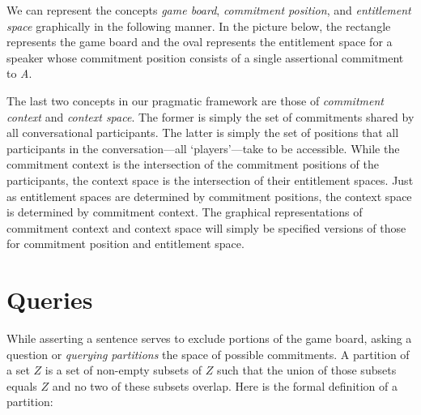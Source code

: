 \documentclass{article}                     %
\makeatletter
\theoremstyle{definition}
\newcommand{\raisemath}[1]{\mathpalette{\raisem@th{#1}}}
\newcommand{\raisem@th}[3]{\raisebox{#1}{$#2#3$}}
\newcommand{\nmc}{%
	\mathbin{\mathpalette\nm@\expandafter}
}
\newcommand{\nm@}{\mid\joinrel\mkern-.5mu\sim\mkern-3mu}
\newcommand{\nnmc}{\not\nmc}
\newcommand{\bigperpp}{%
	\mathop{\mathpalette\bigp@rpp\relax}%
	\displaylimits
}
\newcommand{\bigp@rpp}[2]{%
	\vcenter{
		\m@th\hbox{\scalebox{\ifx#1\displaystyle1.15\else1.15\fi}{$#1\perp$}}
	}%
}
\newcommand{\bigperp}{\raisemath{.5pt}{\bigperpp}}
\makeatother
\begin{document}
We can represent the concepts \textit{game board}, \textit{commitment position}, and \textit{entitlement space} graphically in the following manner.  In the picture below, the rectangle represents the game board and the oval represents the entitlement space for a speaker whose commitment position consists of a single assertional commitment to \textit{A}.  

\begin{center}
	


\end{center}

The last two concepts in our pragmatic framework are those of \textit{commitment context} and \textit{context space}. The former is simply the set of commitments shared by all conversational participants. The latter is simply the set of positions that all participants in the conversation---all `players'---take to be accessible. While the commitment context is the intersection of the commitment positions of the participants, the context space is the intersection of their entitlement spaces. Just as entitlement spaces are determined by commitment positions, the context space is determined by commitment context. The graphical representations of commitment context and context space will simply be specified versions of those for commitment position and entitlement space.


\section{Queries}

While asserting a sentence serves to exclude portions of the game board, asking a question or \textit{querying} \textit{partitions} the space of possible commitments. A partition of a set $ Z $ is a set of non-empty subsets of $ Z $ such that the union of those subsets equals $ Z $ and no two of these subsets overlap. Here is the formal definition of a partition:
\end{document}
